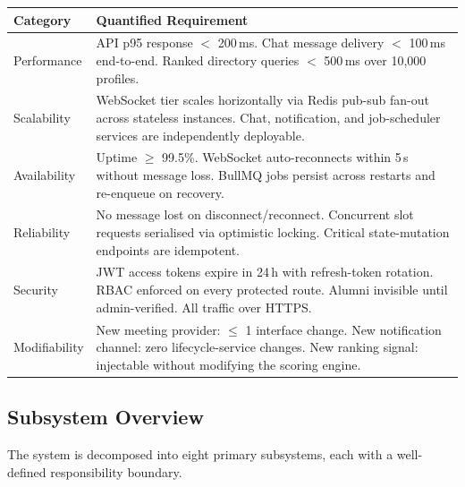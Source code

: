 \documentclass[12pt,a4paper]{article}
\begin{document}
\begin{longtable}{@{}p{2.8cm} p{10cm}@{}}
\toprule
\textbf{Category} & \textbf{Quantified Requirement} \\
\midrule
\endhead
Performance & API p95 response $<$ 200\,ms. Chat message delivery $<$ 100\,ms end-to-end. Ranked directory queries $<$ 500\,ms over 10,000 profiles. \\[4pt]
Scalability & WebSocket tier scales horizontally via Redis pub-sub fan-out across stateless instances. Chat, notification, and job-scheduler services are independently deployable. \\[4pt]
Availability & Uptime $\geq$ 99.5\%. WebSocket auto-reconnects within 5\,s without message loss. BullMQ jobs persist across restarts and re-enqueue on recovery. \\[4pt]
Reliability & No message lost on disconnect/reconnect. Concurrent slot requests serialised via optimistic locking. Critical state-mutation endpoints are idempotent. \\[4pt]
Security & JWT access tokens expire in 24\,h with refresh-token rotation. RBAC enforced on every protected route. Alumni invisible until admin-verified. All traffic over HTTPS. \\[4pt]
Modifiability & New meeting provider: $\leq$ 1 interface change. New notification channel: zero lifecycle-service changes. New ranking signal: injectable without modifying the scoring engine. \\
\bottomrule
\end{longtable}

\subsection{Subsystem Overview}

The system is decomposed into eight primary subsystems, each with a well-defined responsibility boundary.
\end{document}
